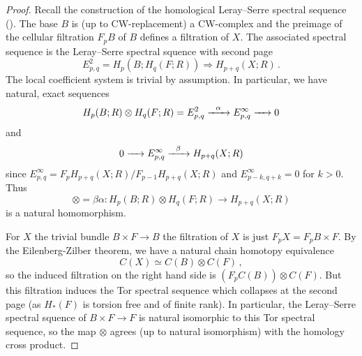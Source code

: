 \begin{proof}
    Recall the construction of the homological Leray--Serre spectral sequence (\cite[Chapter 9]{Spanier199412}).
    The base $B$ is (up to CW-replacement) a CW-complex and the preimage of the cellular filtration $F_pB$ of $B$ defines a filtration of $X$.
    The associated spectral sequence is the Leray--Serre spectral squence with second page
    \[
        E^2_{p,q} = H_p(B; H_q(F;R)) \Rightarrow H_{p+q}(X;R) \,.
    \]
    The local coefficient system is trivial by assumption.
    In particular, we have natural, exact sequences
    \[
        H_p(B;R) \otimes H_q(F;R) = E^2_{p,q} \xrightarrow{\hspace{6pt}{\alpha}\hspace{6pt}} E^\infty_{p,q} \xrightarrow{\hspace{6pt}{}\hspace{6pt}} 0
    \]
    and
    \[
        0 \xrightarrow{\hspace{6pt}{}\hspace{6pt}} E^\infty_{p,q} \xrightarrow{\hspace{6pt}{\beta}\hspace{6pt}} H_{p+q}(X;R)
    \]
    since $E^\infty_{p,q} = F_pH_{p+q}(X;R) / F_{p-1}H_{p+q}(X;R)$ and $E^\infty_{p-k,q+k} = 0$ for $k > 0$.
    Thus
    \[
        \otimes = \beta \alpha \colon H_p(B;R) \otimes H_q(F;R) \to H_{p+q}(X;R)
    \]
    is a natural homomorphism.
    
    For $X$ the trivial bundle $B \times F \to B$ the filtration of $X$ is just $F_pX = F_pB \times F$.
    By the Eilenberg-Zilber theorem, we have a natural chain homotopy equivalence
    \[
        C(X) \simeq C(B) \otimes C(F)\,,
    \]
    so the induced filtration on the right hand side is $(F_pC(B)) \otimes C(F)$.
    But this filtration induces the Tor spectral sequence which collapses at the second page (as $H_\ast(F)$ is torsion free and of finite rank).
    In particular, the Leray--Serre spectral squence of $B \times F \to F$ is natural isomorphic to this Tor spectral sequence, 
    so the map $\otimes$ agrees (up to natural isomorphism) with the homology cross product.
\end{proof}

